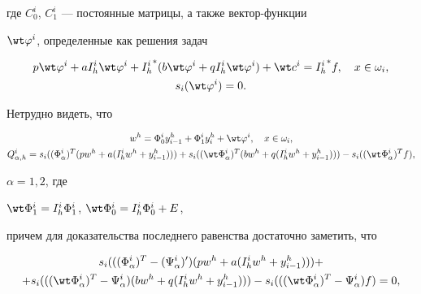 где $C_0^i$, $C_1^i$ --- постоянные матрицы, а также вектор-функции


$\wt \varphi^i$, определенные как решения задач


\begin{gather*}




p\wt \varphi^i+aI_h^i \wt \varphi^i+{I_h^i}^* (b\wt \varphi^i+qI_h^i


\wt \varphi^i) +\wt c^i ={I_h^i }^* f,\quad x \in \omega_i, \\


%




s_i(\wt \varphi^i)=0.


\end{gather*}


Нетрудно видеть, что


\begin{gather} \label{Displ_wh}


w^h=\Phi_0^i y_{i-1}^h+\Phi_1^i y_i^h+\wt \varphi^i,\quad x \in


\omega_i, \\


%




Q_{\alpha,h}^i=s_i((\Phi_\alpha^i)^T(pw^h+a(I_h^i w^h+y_{i-1}^h)))+


s_i((\wt \Phi_\alpha^i)^T (bw^h+q(I_h^i w^h+y_{i-1}^h)))


-s_i((\wt \Phi_\alpha^i)^T f),\notag


\end{gather}


$\alpha=1,2$, где


$\wt \Phi_1^i=I_h^i \Phi_1^i$, $\wt \Phi_0^i=I_h^i \Phi_0^i+E$,


причем для доказательства последнего равенства достаточно заметить, что


\begin{multline*}


s_i((({\Phi_\alpha^i})^T-(\Psi_\alpha^i)')(pw^h+a(I_h^i w^h+y_{i-1}^h)))+ \\


%


+s_i(((\wt \Phi_\alpha^i)^T-\Psi_\alpha^i)(bw^h


+q(I_h^i w^h+y_{i -1}^h))) -s_i(((\wt


\Phi_\alpha^i)^T-\Psi_\alpha^i)f)=0,


\end{multline*}


